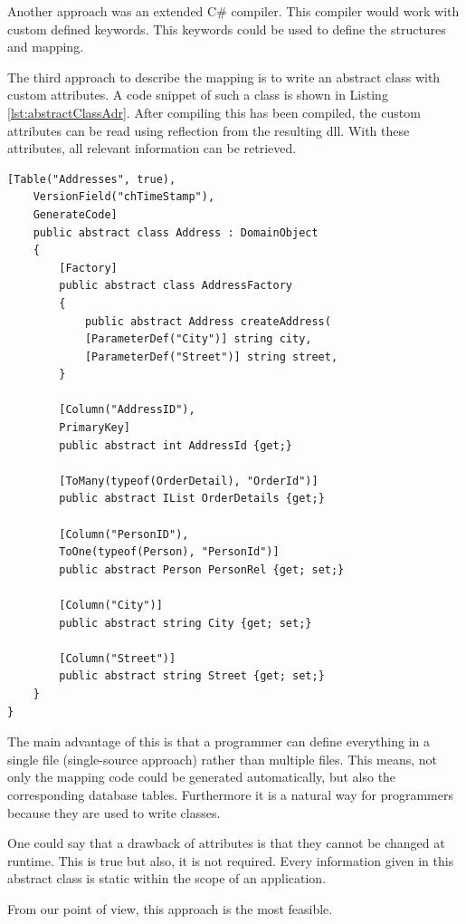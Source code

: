 			Another approach was an extended C\# compiler. This compiler would work with custom defined
			keywords. This keywords could be used to define the structures and mapping.
			
			The third approach to describe the mapping is to write an abstract class
			with custom attributes. A code snippet of such a class is shown in Listing
			\ref{lst:abstractClassAdr}. After compiling this has been compiled, the custom
			attributes can be read using reflection from the resulting dll. With these attributes,
			all relevant information can be retrieved.
			
					\begin{lstlisting}[float=htb,language={[Sharp]C},caption=Abstract class with custom attributes,label=lst:abstractClassAdr]
	[Table("Addresses", true),
	VersionField("chTimeStamp"),
	GenerateCode]
	public abstract class Address : DomainObject
	{
		[Factory]
		public abstract class AddressFactory
		{
			public abstract Address createAddress(
			[ParameterDef("City")] string city,
			[ParameterDef("Street")] string street,
		}

		[Column("AddressID"),
		PrimaryKey]
		public abstract int AddressId {get;}

		[ToMany(typeof(OrderDetail), "OrderId")]
		public abstract IList OrderDetails {get;}

		[Column("PersonID"),
		ToOne(typeof(Person), "PersonId")]
		public abstract Person PersonRel {get; set;}

		[Column("City")]
		public abstract string City {get; set;}

		[Column("Street")]
		public abstract string Street {get; set;}
	}
}
			\end{lstlisting}
			
			The main advantage of this is that a programmer can define everything in a single file (single-source approach)
			rather than multiple files. This means, not only the mapping code could be generated automatically, but also
			the corresponding database tables. Furthermore it is a natural way for programmers because
			they are used to write classes.
			
			One could say that a drawback of attributes is that they cannot be changed at runtime.
			This is true but also, it is not required. Every information given in this 
			abstract class is static within the scope of an application. 
			
			From our point of view, this approach is the most feasible. 
			
